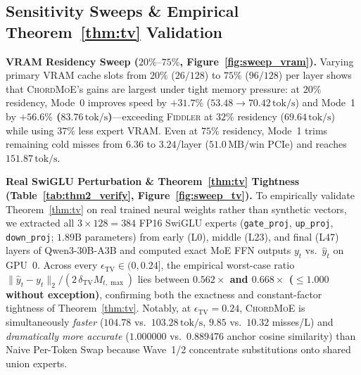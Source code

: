 \documentclass[10pt,twocolumn]{article}
\theoremstyle{definition}
\begin{document}
\subsection{Sensitivity Sweeps \& Empirical Theorem~\ref{thm:tv} Validation}
\label{sec:eval_sweeps}

\noindent\textbf{VRAM Residency Sweep ($20\%\text{--}75\%$, Figure~\ref{fig:sweep_vram}).}
Varying primary VRAM cache slots from $20\%$ ($26/128$) to $75\%$ ($96/128$) per layer shows that \textsc{ChordMoE}'s gains are largest under tight memory pressure: at $20\%$ residency, Mode~0 improves speed by $+31.7\%$ ($53.48 \to 70.42\,\text{tok/s}$) and Mode~1 by \textbf{$+56.6\%$ ($83.76\,\text{tok/s}$)}—exceeding \textsc{Fiddler} at $32\%$ residency ($69.64\,\text{tok/s}$) while using $37\%$ less expert VRAM. Even at $75\%$ residency, Mode~1 trims remaining cold misses from $6.36$ to $3.24$/layer ($51.0\,\text{MB/win}$ PCIe) and reaches $151.87\,\text{tok/s}$.

\vspace{2pt}
\noindent\textbf{Real SwiGLU Perturbation \& Theorem~\ref{thm:tv} Tightness (Table~\ref{tab:thm2_verify}, Figure~\ref{fig:sweep_tv}).}
To empirically validate Theorem~\ref{thm:tv} on real trained neural weights rather than synthetic vectors, we extracted all $3 \times 128 = 384$ FP16 SwiGLU experts (\texttt{gate\_proj}, \texttt{up\_proj}, \texttt{down\_proj}; $1.89\text{B}$ parameters) from early (L0), middle (L23), and final (L47) layers of Qwen3-30B-A3B and computed exact MoE FFN outputs $y_t$ vs.\ $\hat{y}_t$ on GPU~0. Across every $\epsilon_{\mathrm{TV}} \in (0, 0.24]$, the empirical worst-case ratio $\|\hat{y}_t - y_t\|_2 / (2\,\delta_{\mathrm{TV}} M_{t,\max})$ lies between \textbf{$0.562\times$ and $0.668\times$ ($\le 1.000$ without exception)}, confirming both the exactness and constant-factor tightness of Theorem~\ref{thm:tv}. Notably, at $\epsilon_{\mathrm{TV}} = 0.24$, \textsc{ChordMoE} is simultaneously \emph{faster} ($104.78$ vs.\ $103.28\,\text{tok/s}$, $9.85$ vs.\ $10.32$ misses/L) and \emph{dramatically more accurate} ($1.000000$ vs.\ $0.889476$ anchor cosine similarity) than Naive Per-Token Swap because Wave~1/2 concentrate substitutions onto shared union experts.
\end{document}
